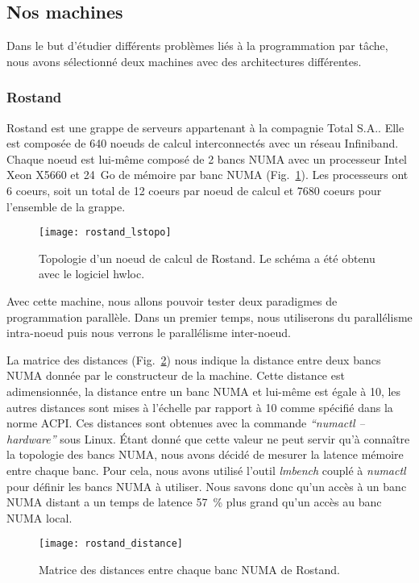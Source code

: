 \subsection{Nos machines}
Dans le but d'étudier différents problèmes liés à la programmation par tâche, nous avons sélectionné deux machines avec des architectures différentes.

\subsubsection{Rostand}
Rostand est une grappe de serveurs appartenant à la compagnie Total S.A..
%
Elle est composée de 640 noeuds de calcul interconnectés avec un réseau Infiniband.
%
Chaque noeud est lui-même composé de 2 bancs NUMA avec un processeur Intel Xeon X5660 et 24~Go de mémoire par banc NUMA (Fig.~\ref{fig:rostand}).
%
Les processeurs ont 6 coeurs, soit un total de 12 coeurs par noeud de calcul et 7680 coeurs pour l'ensemble de la grappe.

\begin{figure}[!h]
        \centering
        \texttt{[image: rostand\_lstopo]}
        \caption{Topologie d'un noeud de calcul de Rostand. Le schéma a été obtenu avec le logiciel hwloc.}
        \label{fig:rostand}
\end{figure}
Avec cette machine, nous allons pouvoir tester deux paradigmes de programmation parallèle.
%
Dans un premier temps, nous utiliserons du parallélisme intra-noeud puis nous verrons le parallélisme inter-noeud.

La matrice des distances (Fig.~\ref{fig:rostand_distance}) nous indique la distance entre deux bancs NUMA donnée par le constructeur de la machine.
%
Cette distance est adimensionnée, la distance entre un banc NUMA et lui-même est égale à 10, les autres distances sont mises à l'échelle par rapport à 10 comme spécifié dans la norme ACPI.
%
Ces distances sont obtenues avec la commande {\em ``numactl --hardware''} sous Linux.
%
\'Etant donné que cette valeur ne peut servir qu'à connaître la topologie des bancs NUMA, nous avons décidé de mesurer la latence mémoire entre chaque banc.
%
Pour cela, nous avons utilisé l'outil {\em lmbench} couplé à {\em numactl} pour définir les bancs NUMA à utiliser.
%
Nous savons donc qu'un accès à un banc NUMA distant a un temps de latence 57~\% plus grand qu'un accès au banc NUMA local.

\begin{figure}[!h]
        \centering
        \texttt{[image: rostand\_distance]}
        \caption{Matrice des distances entre chaque banc NUMA de Rostand.}
        \label{fig:rostand_distance}
\end{figure}
